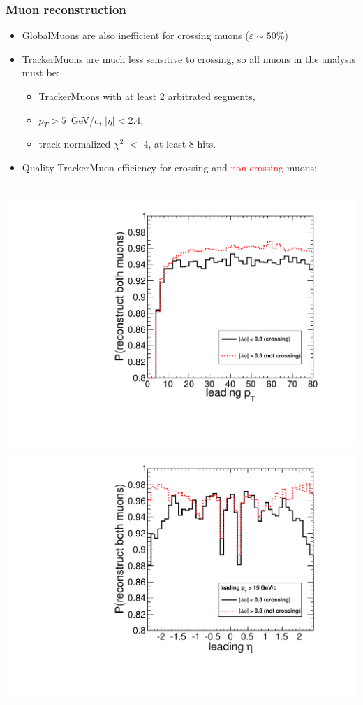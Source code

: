 \documentclass[compress]{beamer}
\begin{document}
\begin{frame}
\frametitle{Muon reconstruction}

\begin{itemize}
\item GlobalMuons are also inefficient for crossing muons ($\varepsilon \sim 50$\%)
\item TrackerMuons are much less sensitive to crossing, so all muons in the analysis must be:
\begin{itemize}
\item TrackerMuons with at least 2 arbitrated segments,
\item $p_T > 5$~GeV/$c$, $|\eta| < 2.4$,
\item track normalized $\chi^2$ $<$ 4, at least 8 hits.
\end{itemize}

\item Quality TrackerMuon efficiency for crossing and \textcolor{red}{non-crossing} muons:
\end{itemize}

\mbox{ } \hfill \includegraphics[width=0.4\linewidth]{pt_mass5cut_twoTrackerMuons.pdf} \hfill
\includegraphics[width=0.4\linewidth]{eta_mass5cut_twoTrackerMuons.pdf} \hfill \mbox{ }
\end{frame}
\end{document}
